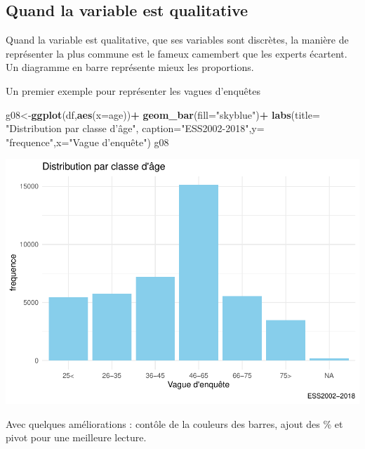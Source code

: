 \documentclass[
]{book}
\newenvironment{Shaded}{\begin{snugshade}}{\end{snugshade}}
\newcommand{\DataTypeTok}[1]{\textcolor[rgb]{0.13,0.29,0.53}{#1}}
\newcommand{\KeywordTok}[1]{\textcolor[rgb]{0.13,0.29,0.53}{\textbf{#1}}}
\newcommand{\NormalTok}[1]{#1}
\newcommand{\OperatorTok}[1]{\textcolor[rgb]{0.81,0.36,0.00}{\textbf{#1}}}
\newcommand{\StringTok}[1]{\textcolor[rgb]{0.31,0.60,0.02}{#1}}
\begin{document}
\hypertarget{quand-la-variable-est-qualitative}{%
\subsection{Quand la variable est qualitative}\label{quand-la-variable-est-qualitative}}

Quand la variable est qualitative, que ses variables sont discrètes, la manière de représenter la plus commune est le fameux camembert que les experts écartent. Un diagramme en barre représente mieux les proportions.

Un premier exemple pour représenter les vagues d'enquêtes

\begin{Shaded}
\begin{Highlighting}[]
\NormalTok{g08<-}\KeywordTok{ggplot}\NormalTok{(df,}\KeywordTok{aes}\NormalTok{(}\DataTypeTok{x=}\NormalTok{age))}\OperatorTok{+}
\StringTok{  }\KeywordTok{geom_bar}\NormalTok{(}\DataTypeTok{fill=}\StringTok{"skyblue"}\NormalTok{)}\OperatorTok{+}
\StringTok{  }\KeywordTok{labs}\NormalTok{(}\DataTypeTok{title=} \StringTok{"Distribution par classe d'âge"}\NormalTok{, }\DataTypeTok{caption=}\StringTok{"ESS2002-2018"}\NormalTok{,}\DataTypeTok{y=} \StringTok{"frequence"}\NormalTok{,}\DataTypeTok{x=}\StringTok{"Vague d'enquête") }
\StringTok{g08}
\end{Highlighting}
\end{Shaded}

\includegraphics{bookdown-demo_files/figure-latex/308-1.pdf}

Avec quelques améliorations : contôle de la couleurs des barres, ajout des \% et pivot pour une meilleure lecture.
\end{document}
